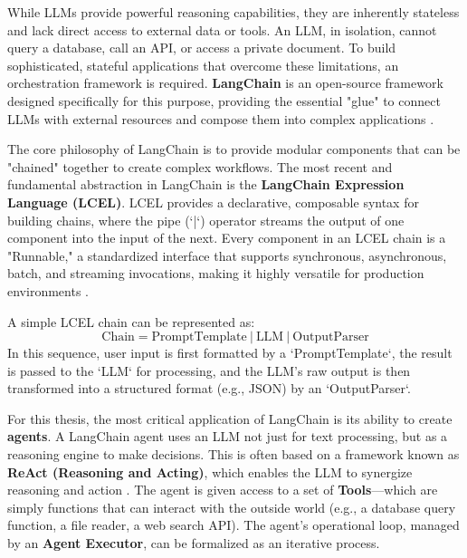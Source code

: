 While LLMs provide powerful reasoning capabilities, they are inherently stateless and lack direct access to external data or tools. An LLM, in isolation, cannot query a database, call an API, or access a private document. To build sophisticated, stateful applications that overcome these limitations, an orchestration framework is required. \textbf{LangChain} is an open-source framework designed specifically for this purpose, providing the essential "glue" to connect LLMs with external resources and compose them into complex applications \cite{FIND_CITATION_PLEASE}.

The core philosophy of LangChain is to provide modular components that can be "chained" together to create complex workflows. The most recent and fundamental abstraction in LangChain is the \textbf{LangChain Expression Language (LCEL)}. LCEL provides a declarative, composable syntax for building chains, where the pipe (`|`) operator streams the output of one component into the input of the next. Every component in an LCEL chain is a "Runnable," a standardized interface that supports synchronous, asynchronous, batch, and streaming invocations, making it highly versatile for production environments \cite{FIND_CITATION_PLEASE}.

A simple LCEL chain can be represented as:
$$ \text{Chain} = \text{PromptTemplate} \ | \ \text{LLM} \ | \ \text{OutputParser} $$
In this sequence, user input is first formatted by a `PromptTemplate`, the result is passed to the `LLM` for processing, and the LLM's raw output is then transformed into a structured format (e.g., JSON) by an `OutputParser`.

For this thesis, the most critical application of LangChain is its ability to create \textbf{agents}. A LangChain agent uses an LLM not just for text processing, but as a reasoning engine to make decisions. This is often based on a framework known as \textbf{ReAct (Reasoning and Acting)}, which enables the LLM to synergize reasoning and action \cite{FIND_CITATION_PLEASE}. The agent is given access to a set of \textbf{Tools}—which are simply functions that can interact with the outside world (e.g., a database query function, a file reader, a web search API). The agent's operational loop, managed by an \textbf{Agent Executor}, can be formalized as an iterative process.

